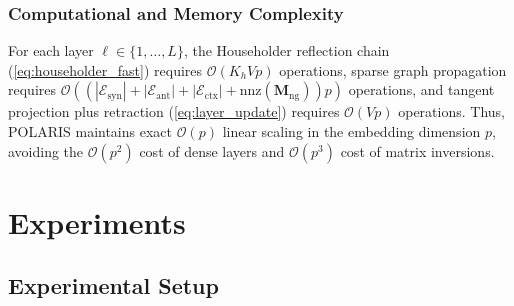 \documentclass[journal]{IEEEtran}
\begin{document}
\subsubsection{Computational and Memory Complexity}
For each layer $\ell \in \{1, \dots, L\}$, the Householder reflection chain (\ref{eq:householder_fast}) requires $\mathcal{O}(K_h V p)$ operations, sparse graph propagation requires $\mathcal{O}((|\mathcal{E}_{\text{syn}}| + |\mathcal{E}_{\text{ant}}| + |\mathcal{E}_{\text{ctx}}| + \text{nnz}(\mathbf{M}_{\text{ng}}))p)$ operations, and tangent projection plus retraction (\ref{eq:layer_update}) requires $\mathcal{O}(Vp)$ operations. Thus, POLARIS maintains exact $\mathcal{O}(p)$ linear scaling in the embedding dimension $p$, avoiding the $\mathcal{O}(p^2)$ cost of dense layers and $\mathcal{O}(p^3)$ cost of matrix inversions.

\section{Experiments}

\subsection{Experimental Setup}
\end{document}
